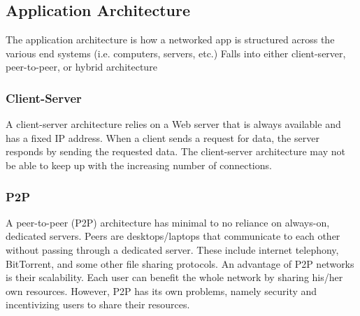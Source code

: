 \documentclass{article}
\begin{document}
    
    



\subsection{Application Architecture}
The application architecture is how a networked app is structured
across the various end systems (i.e. computers, servers, etc.) \autocite{kurose}
Falls into either client-server, peer-to-peer, or hybrid architecture


\subsubsection{Client-Server}
A client-server architecture relies on a Web server that is always
available and has a fixed IP address. When a client sends a request for data, the server responds by sending the requested data. The client-server architecture may not be able to keep up with the increasing number of connections.

\subsubsection{P2P}
A peer-to-peer (P2P) architecture has minimal to no reliance on
always-on, dedicated servers. Peers are desktops/laptops that communicate to each other without passing through a dedicated server. These include internet telephony, BitTorrent, and some other file sharing protocols. An advantage of P2P networks is their scalability. Each user can benefit the whole network by sharing his/her own resources. However, P2P has its own problems, namely security and incentivizing users to share their resources.
\end{document}
